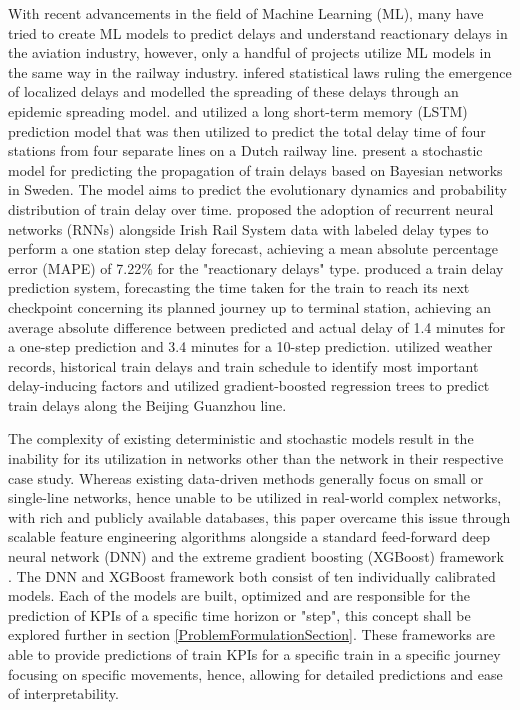 \documentclass[]{interact}
\theoremstyle{plain}%
\theoremstyle{definition}
\theoremstyle{remark}
\begin{document}
With recent advancements in the field of Machine Learning (ML), many have tried to create ML models to predict delays and understand reactionary delays in the aviation industry, however, only a handful of projects utilize ML models in the same way in the railway industry. \cite{Monechi_2018} infered statistical laws ruling the emergence of localized delays and modelled the spreading of these delays through an epidemic spreading model. \cite{WEN20} and \cite{HUANG20} utilized a long short-term memory (LSTM) prediction model that was then utilized to predict the total delay time of four stations from four separate lines on a Dutch railway line. \cite{COR18} present a stochastic model for predicting the propagation of train delays based on Bayesian networks in Sweden. The model aims to predict the evolutionary dynamics and probability distribution of train delay over time. \cite{Bos16} proposed the adoption of recurrent neural networks (RNNs) alongside Irish Rail System data with labeled delay types to perform a one station step delay forecast, achieving a mean absolute percentage error (MAPE) of 7.22\% for the "reactionary delays" type.  \cite{LUC17} produced a train delay prediction system, forecasting the time taken for the train to reach its next checkpoint concerning its planned journey up to terminal station, achieving an average absolute difference between predicted and actual delay of 1.4 minutes for a one-step prediction and 3.4 minutes for a 10-step prediction. \cite{WAN19} utilized weather records, historical train delays and train schedule to identify most important delay-inducing factors and utilized gradient-boosted regression trees to predict train delays along the Beijing Guanzhou line. 

 The complexity of existing deterministic and stochastic models result in the inability for its utilization in networks other than the network in their respective case study. Whereas existing data-driven methods generally focus on small or single-line networks, hence unable to be utilized in real-world complex networks, with rich and publicly available databases, this paper overcame this issue through scalable feature engineering algorithms alongside a standard feed-forward deep neural network (DNN) \citep{bishop_2013} and the extreme gradient boosting (XGBoost) framework \citep{CHEN16}. The DNN and XGBoost framework both consist of ten individually calibrated models.  Each of the models are built, optimized and are responsible for the prediction of KPIs of a specific time horizon or "step", this concept shall be explored further in section \ref{ProblemFormulationSection}. These frameworks are able to provide predictions of train KPIs for a specific train in a specific journey focusing on specific movements, hence, allowing for detailed predictions and ease of interpretability.
 
\end{document}
